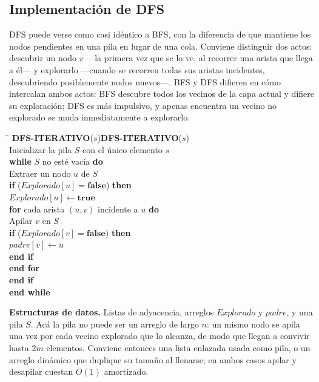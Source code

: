 \documentclass[12pt, spanish, oneside, openany]{book}
\newcommand{\pl}[1]{\makebox[1.6em][r]{\texttt{\footnotesize #1}}\hspace{0.9em}}
\newenvironment{pseudo}[1]{%
  \begin{center}%
  \begin{mdframed}[style=pseudobox]%
  \small
  \begin{tabbing}%
  \hspace{2.5em}\=\hspace{1.5em}\=\hspace{1.5em}\=\hspace{1.5em}\=\hspace{1.5em}\=\kill
  \def\pseudotitulo{#1}\ifx\pseudotitulo\empty\else#1\\[3pt]\fi}%
  {\end{tabbing}\end{mdframed}\end{center}}
\newenvironment{estructuras}%
  {\begin{center}\begin{minipage}{0.93\textwidth}\begin{mdframed}[style=estrbox]%
   \small\textbf{Estructuras de datos.}\;}%
  {\end{mdframed}\end{minipage}\end{center}}
\theoremstyle{uprightplain}
\theoremstyle{definition}
\theoremstyle{remark}
\theoremstyle{definition}
\begin{document}
\subsection{Implementación de DFS}

DFS puede verse como casi idéntico a BFS, con la diferencia de que mantiene los nodos pendientes en una pila en lugar de una cola. Conviene distinguir dos actos: descubrir un nodo $v$ ---la primera vez que se lo ve, al recorrer una arista que llega a él--- y explorarlo ---cuando se recorren todas sus aristas incidentes, descubriendo posiblemente nodos nuevos---. BFS y DFS difieren en cómo intercalan ambos actos: BFS descubre todos los vecinos de la capa actual y difiere su exploración; DFS es más impulsivo, y apenas encuentra un vecino no explorado se muda inmediatamente a explorarlo.

\begin{pseudo}{\textbf{DFS-ITERATIVO}($s$)}
\pl{1}\> Inicializar la pila $S$ con el único elemento $s$\\
\pl{2}\> \textbf{while} $S$ no esté vacía \textbf{do}\\
\pl{3}\>\> Extraer un nodo $u$ de $S$\\
\pl{4}\>\> \textbf{if} ($\mathit{Explorado}[u] = \textbf{false}$) \textbf{then}\\
\pl{5}\>\>\> $\mathit{Explorado}[u] \leftarrow \textbf{true}$\\
\pl{6}\>\>\> \textbf{for} cada arista $(u,v)$ incidente a $u$ \textbf{do}\\
\pl{7}\>\>\>\> Apilar $v$ en $S$\\
\pl{8}\>\>\>\> \textbf{if} ($\mathit{Explorado}[v] = \textbf{false}$) \textbf{then}\\
\pl{9}\>\>\>\>\> $\mathit{padre}[v] \leftarrow u$\\
\pl{10}\>\>\>\> \textbf{end if}\\
\pl{11}\>\>\> \textbf{end for}\\
\pl{12}\>\> \textbf{end if}\\
\pl{13}\> \textbf{end while}
\end{pseudo}

\begin{estructuras}
Listas de adyacencia, arreglos $\mathit{Explorado}$ y $\mathit{padre}$,
y una pila $S$. Acá la pila no puede ser un arreglo de largo $n$: un
mismo nodo se apila una vez por cada vecino explorado que lo alcanza, de modo que
llegan a convivir hasta $2m$ elementos. Conviene entonces una lista
enlazada usada como pila, o un arreglo dinámico que duplique su tamaño
al llenarse; en ambos casos apilar y desapilar cuestan $O(1)$ amortizado.
\end{estructuras}
\end{document}
